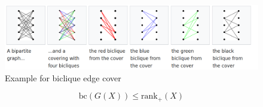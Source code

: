 \begin{frame}

\begin{figure}
\centering
\includegraphics[scale=0.2]{../images/biclique.png}
\caption{Example for biclique edge cover \cite{biclique}}
\end{figure}

\begin{thm}
\[\text{bc}(G(X))\leq \text{rank}_+(X)
\]
\end{thm}
\end{frame}

